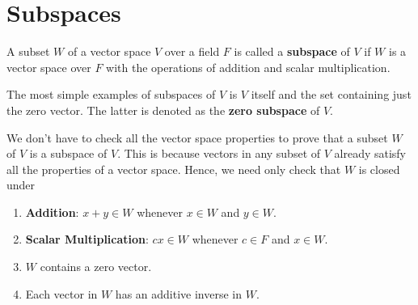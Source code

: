 \section{Subspaces}

\begin{definition}[Subspaces]
   A subset \( W  \) of a vector space \( V  \) over a field \( F  \) is called a \textbf{subspace} of \( V  \) if \( W  \) is a vector space over \( F  \) with the operations of addition and scalar multiplication.
\end{definition}


The most simple examples of subspaces of \( V  \) is \( V  \) itself and the set containing just the zero vector. The latter is denoted as the \textbf{zero subspace} of \( V  \).


We don't have to check all the vector space properties to prove that a subset \( W \) of \( V  \) is a subspace of \( V  \). This is because vectors in any subset of \( V  \) already satisfy all the properties of a vector space. Hence, we need only check that \( W  \) is closed under 
\begin{enumerate}
    \item \textbf{Addition}: \( x + y \in W  \) whenever \( x \in W  \) and \( y \in W  \).
    \item \textbf{Scalar Multiplication}: \( cx \in W  \) whenever \( c \in F  \) and \( x \in W  \).
    \item \( W  \) contains a zero vector.
    \item Each vector in \( W  \) has an additive inverse in \( W  \).
\end{enumerate}

